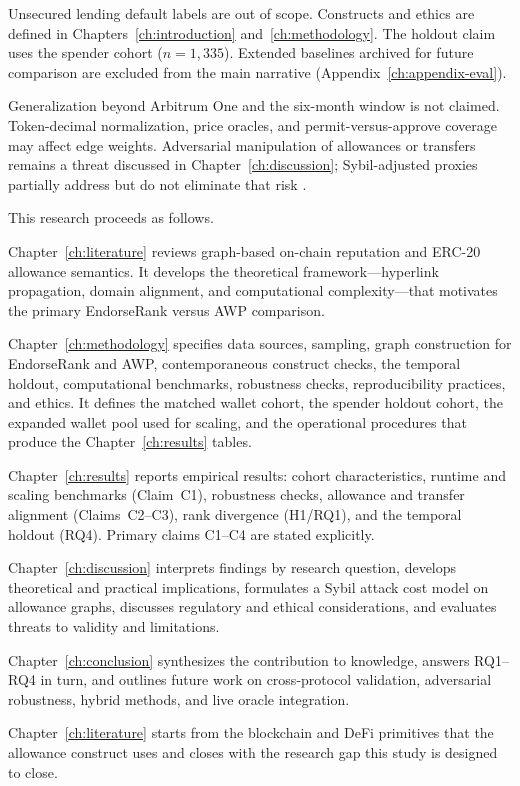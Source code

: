 Unsecured lending default labels are out of scope. Constructs and ethics are defined in Chapters~\ref{ch:introduction} and~\ref{ch:methodology}. The holdout claim uses the spender cohort ($n=1{,}335$). Extended baselines archived for future comparison are excluded from the main narrative (Appendix~\ref{ch:appendix-eval}).

Generalization beyond Arbitrum One and the six-month window is not claimed. Token-decimal normalization, price oracles, and permit-versus-approve coverage may affect edge weights. Adversarial manipulation of allowances or transfers remains a threat discussed in Chapter~\ref{ch:discussion}; Sybil-adjusted proxies partially address but do not eliminate that risk .


This research proceeds as follows.

Chapter~\ref{ch:literature} reviews graph-based on-chain reputation and ERC-20 allowance semantics. It develops the theoretical framework---hyperlink propagation, domain alignment, and computational complexity---that motivates the primary EndorseRank versus AWP comparison.

Chapter~\ref{ch:methodology} specifies data sources, sampling, graph construction for EndorseRank and AWP, contemporaneous construct checks, the temporal holdout, computational benchmarks, robustness checks, reproducibility practices, and ethics. It defines the matched wallet cohort, the spender holdout cohort, the expanded wallet pool used for scaling, and the operational procedures that produce the Chapter~\ref{ch:results} tables.

Chapter~\ref{ch:results} reports empirical results: cohort characteristics, runtime and scaling benchmarks (Claim~C1), robustness checks, allowance and transfer alignment (Claims~C2--C3), rank divergence (H1/RQ1), and the temporal holdout (RQ4). Primary claims C1--C4 are stated explicitly.

Chapter~\ref{ch:discussion} interprets findings by research question, develops theoretical and practical implications, formulates a Sybil attack cost model on allowance graphs, discusses regulatory and ethical considerations, and evaluates threats to validity and limitations.

Chapter~\ref{ch:conclusion} synthesizes the contribution to knowledge, answers RQ1--RQ4 in turn, and outlines future work on cross-protocol validation, adversarial robustness, hybrid methods, and live oracle integration.

Chapter~\ref{ch:literature} starts from the blockchain and DeFi primitives that the allowance construct uses and closes with the research gap this study is designed to close.
